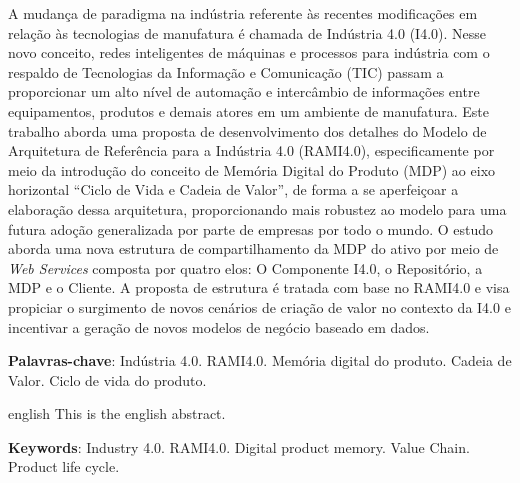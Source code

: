 \setlength{\absparsep}{18pt} %
\begin{resumo}
	A mudança de paradigma na indústria referente às recentes modificações em relação às tecnologias de manufatura é chamada de Indústria 4.0 (I4.0). Nesse novo conceito, redes inteligentes de máquinas e processos para indústria com o respaldo de Tecnologias da Informação e Comunicação (TIC) passam a proporcionar um alto nível de automação e intercâmbio de informações entre equipamentos, produtos e demais atores em um ambiente de manufatura.
	Este trabalho aborda uma proposta de desenvolvimento dos detalhes do Modelo de Arquitetura de Referência para a Indústria 4.0 (RAMI4.0), especificamente por meio da introdução do conceito de Memória Digital do Produto (MDP) ao eixo horizontal ``Ciclo de Vida e Cadeia de Valor'', de forma a se aperfeiçoar a elaboração dessa arquitetura, proporcionando mais robustez ao modelo para uma futura adoção generalizada por parte de empresas por todo o mundo.
	O estudo aborda uma nova estrutura de compartilhamento da MDP do ativo por meio de \textit{Web Services} composta por quatro elos: O Componente I4.0, o Repositório, a MDP e o Cliente. A proposta de estrutura é tratada com base no RAMI4.0 e visa propiciar o surgimento de novos cenários de criação de valor no contexto da I4.0 e incentivar a geração de novos modelos de negócio baseado em dados.
	
	\textbf{Palavras-chave}: Indústria 4.0. RAMI4.0. Memória digital do produto. Cadeia de Valor. Ciclo de vida do produto.
\end{resumo}

\begin{resumo}[Abstract]
	\begin{otherlanguage*}{english}
		This is the english abstract.
		
		\vspace{\onelineskip}
		
		\noindent 
		\textbf{Keywords}: Industry 4.0. RAMI4.0. Digital product memory. Value Chain. Product life cycle. 
	\end{otherlanguage*}
\end{resumo}

\listoffigures*
\cleardoublepage

\listoftables*
\cleardoublepage

